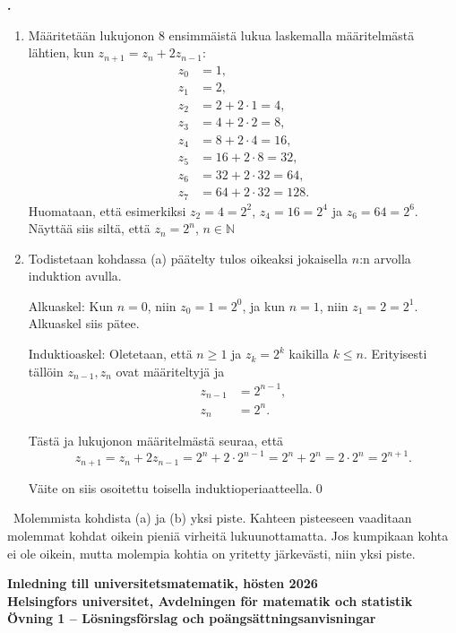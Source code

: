 \documentclass[11pt,a4paper,oneside,notitlepage,final]{article}
\newcommand{\N}{\mathbb{N}}
\newcounter{harjnro}
\newenvironment{harjlist}
  {\begin{list}{\kor{\arabic{harjnro}.}}
    {\usecounter{harjnro}
      \setlength{\labelwidth}{0em}
      \setlength{\labelsep}{0.4em}
      \setlength{\leftmargin}{0pt}
      \setlength{\parsep}{5pt}
      \setlength{\itemindent}{0.4em}
      \setlength{\topsep}{0.5\parskip}
      \setlength{\itemsep}{0.75\parskip}
    }
  }
  {\end{list}}
\newcommand{\kor}[1]{\textbf{#1}}
\begin{document}
\begin{harjlist}
\vspace{0.4cm}
\ratkaisu
\begin{enumerate}
\item[(a)] Määritetään lukujonon 8 ensimmäistä lukua laskemalla määritelmästä lähtien, 
kun $z_{n+1}=z_n+2z_{n-1}$:
\begin{align*}
z_0&=1,\\
z_1&=2,\\
z_2&=2+2\cdot 1=4,\\
z_3&=4+2\cdot 2=8,\\
z_4&=8+2\cdot 4=16,\\
z_5&=16+2\cdot 8=32,\\
z_6&=32+2\cdot 32=64,\\
z_7&=64+2\cdot 32=128.
\end{align*}
Huomataan, että esimerkiksi 
$z_2=4=2^2$, $z_4=16=2^4$ ja $z_6=64=2^6$.\\

Näyttää siis siltä, että $z_n=2^n$, $n\in \N$\\

\item[(b)] Todistetaan kohdassa (a) päätelty tulos oikeaksi jokaisella $n$:n arvolla induktion avulla.

Alkuaskel: Kun $n=0$, niin $z_0=1=2^0$, ja kun $n=1$, niin $z_1=2=2^1$. Alkuaskel siis pätee. 

Induktioaskel: Oletetaan, että $n\geq 1$ ja $z_k=2^k$ kaikilla $k\le n$. Erityisesti tällöin $z_{n-1}, z_{n}$ ovat määriteltyjä ja 
\begin{align*}
z_{n-1}&=2^{n-1},\\
z_{n}&=2^{n}.
\end{align*}

Tästä ja lukujonon määritelmästä seuraa, että
$$z_{n+1}=z_{n}+2 z_{n-1}=2^n+2\cdot 2^{n-1}=2^{n}+2^{n}=2\cdot 2^{n}=2^{n+1}.$$

Väite on siis osoitettu toisella induktioperiaatteella.\qed

\end{enumerate}

\arvostelu \
Molemmista kohdista (a) ja (b) yksi piste. Kahteen pisteeseen vaaditaan molemmat kohdat
oikein pieniä virheitä lukuunottamatta. Jos kumpikaan kohta ei ole oikein, mutta molempia
kohtia on yritetty järkevästi, niin yksi piste.

\end{harjlist}

\newpage

{
\kor{Inledning till universitetsmatematik, hösten 2026 \\
Helsingfors universitet, Avdelningen för matematik och statistik \\
Övning 1 -- Lösningsförslag och poängsättningsanvisningar}\\
%
}
\end{document}
